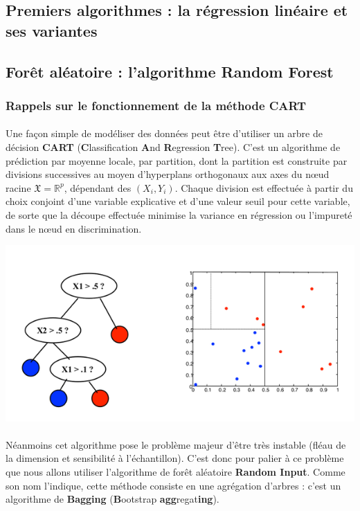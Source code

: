 \documentclass[14pt, openany]{article}
\begin{document}
\subsection{Premiers algorithmes : la régression linéaire et ses variantes}

\subsection{Forêt aléatoire : l'algorithme Random Forest}
\subsubsection{Rappels sur le fonctionnement de la méthode CART}
\paragraph{}
Une façon simple de modéliser des données peut être d'utiliser un arbre de décision \textbf{CART} (\textbf{C}lassification \textbf{A}nd \textbf{R}egression \textbf{T}ree). C'est un algorithme de prédiction par moyenne locale, par partition, dont la partition est construite par divisions successives au moyen d'hyperplans orthogonaux aux axes du nœud racine $\mathfrak{X}=\mathbb{R}^{p}$, dépendant des $(X_i,Y_i)$. Chaque division est effectuée à partir du choix conjoint d'une variable explicative et d'une valeur seuil pour cette variable, de sorte que la découpe effectuée minimise la variance en régression ou l'impureté dans le nœud en discrimination.
\begin{center}
\includegraphics[scale=0.55]{Images/cart.png}
\end{center}
\begin{center}
\label{fig1}
\end{center}
\paragraph{}
Néanmoins cet algorithme pose le problème majeur d'être très instable (fléau de la dimension et sensibilité à l'échantillon). C'est donc pour palier à ce problème que nous allons utiliser l'algorithme de forêt aléatoire \textbf{Random Input}. Comme son nom l'indique, cette méthode consiste en une agrégation d'arbres : c'est un algorithme de \textbf{Bagging} (\textbf{B}ootstrap \textbf{agg}regat\textbf{ing}). 
\end{document}
